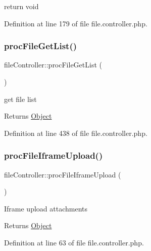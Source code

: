 \begin{DoxyPre}return void
\end{DoxyPre}


Definition at line 179 of file file.\+controller.\+php.

\mbox{\label{classfileController_ad1cdb6696de4e0c90532412bb80a359e}} 
\subsubsection{\texorpdfstring{proc\+File\+Get\+List()}{procFileGetList()}}
{\footnotesize\ttfamily file\+Controller\+::proc\+File\+Get\+List (\begin{DoxyParamCaption}{ }\end{DoxyParamCaption})}

get file list

\begin{DoxyReturn}{Returns}
\hyperlink{classObject}{Object} 
\end{DoxyReturn}


Definition at line 438 of file file.\+controller.\+php.

\mbox{\label{classfileController_a423c909fc5841f83d9a965839180aad5}} 
\subsubsection{\texorpdfstring{proc\+File\+Iframe\+Upload()}{procFileIframeUpload()}}
{\footnotesize\ttfamily file\+Controller\+::proc\+File\+Iframe\+Upload (\begin{DoxyParamCaption}{ }\end{DoxyParamCaption})}

Iframe upload attachments

\begin{DoxyReturn}{Returns}
\hyperlink{classObject}{Object} 
\end{DoxyReturn}


Definition at line 63 of file file.\+controller.\+php.

\mbox{\label{classfileController_a29e461f3cb7a84ddbb07b0abcdeef2e5}} 
